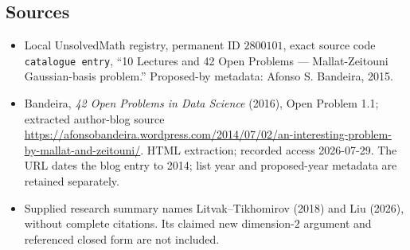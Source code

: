 \documentclass[11pt]{article}
\begin{document}
\subsection{Sources}
\begin{itemize}
\item Local UnsolvedMath registry, permanent ID \(2800101\), exact source code \texttt{catalogue entry}, ``10 Lectures and 42 Open Problems --- Mallat-Zeitouni Gaussian-basis problem.'' Proposed-by metadata: Afonso S. Bandeira, 2015.
\item Bandeira, \emph{42 Open Problems in Data Science} (2016), Open Problem 1.1; extracted author-blog source \url{https://afonsobandeira.wordpress.com/2014/07/02/an-interesting-problem-by-mallat-and-zeitouni/}. HTML extraction; recorded access 2026-07-29. The URL dates the blog entry to 2014; list year and proposed-year metadata are retained separately.
\item Supplied research summary names Litvak--Tikhomirov (2018) and Liu (2026), without complete citations. Its claimed new dimension-\(2\) argument and referenced closed form are not included.
\end{itemize}
\end{document}
